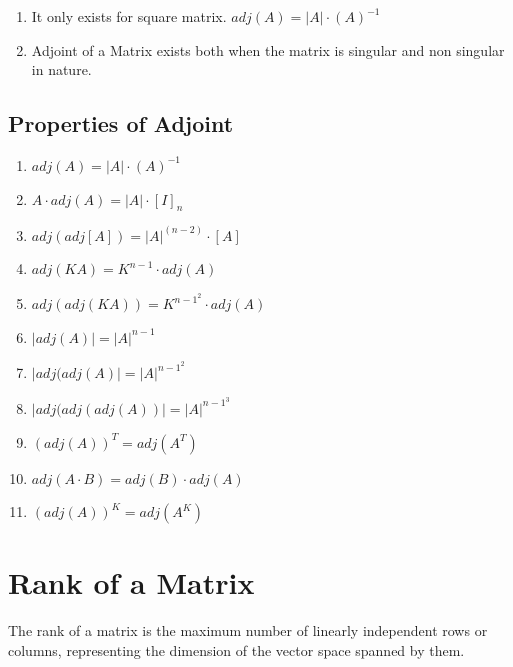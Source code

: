 \begin{enumerate}
    \item It only exists for square matrix. $adj(A) = |A| \cdot (A)^{-1}$

    \item Adjoint of a Matrix exists both when the matrix is singular and non singular in nature.

\end{enumerate}

\subsection{Properties of Adjoint}

\begin{enumerate}
        \item $adj(A) = |A| \cdot (A)^{-1}$

        \item $A \cdot adj(A) = |A| \cdot [I]_n$

        \item $adj(adj[A]) = |A|^{(n-2)} \cdot [A]$

        \item $adj(KA) = K^{n-1} \cdot adj(A)$

        \item $adj(adj(KA)) = K^{{n-1}^2} \cdot adj(A)$

        \item $|adj(A)| = |A|^{n-1}$

        \item $|adj(adj(A)| = |A|^{{n-1}^2}$

        \item $|adj(adj(adj(A))| = |A|^{{n-1}^3}$

        \item $(adj(A))^T = adj(A^T)$

        \item $adj(A \cdot B) = adj(B) \cdot adj(A)$

        \item $(adj(A))^K = adj(A^K)$
    \end{enumerate}

    \section{Rank of a Matrix}
The rank of a matrix is the maximum number of linearly independent rows or columns, representing the dimension of the vector space spanned by them.

